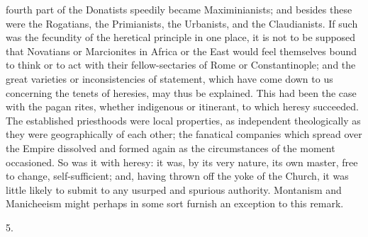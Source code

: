 fourth part of the Donatists speedily became
Maximinianists; and besides these were the Rogatians, the
Primianists, the Urbanists, and the Claudianists. If such
was the fecundity of the heretical principle in one
place, it is not to be supposed that Novatians or
Marcionites in Africa or the East would feel themselves
bound to think or to act with their fellow-sectaries of
Rome or Constantinople; and the great varieties or
inconsistencies of statement, which have come down to us
concerning the tenets of heresies, may thus be explained.
This had been the case with the pagan rites, whether
indigenous or itinerant, to which heresy succeeded. The
established priesthoods were local properties, as
independent theologically as they were geographically of
each other; the fanatical companies which spread over the
Empire dissolved and formed again as the circumstances of
the moment occasioned. So was it with heresy: it was, by
its very nature, its own master, free to change,
self-sufficient; and, having thrown off the yoke of the
Church, it was little likely to submit to any usurped and
spurious authority. Montanism and Manicheeism might
perhaps in some sort furnish an exception to this remark.

5.

